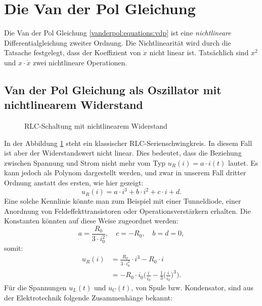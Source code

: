%
%
\section{Die Van der Pol Gleichung
\label{vanderpol:section:vdp_gleichung}}
Die Van der Pol Gleichung \eqref{vanderpol:equations:vdp} ist eine {\em nichtlineare} Differentialgleichung zweiter Ordnung. 
%
Die Nichtlinearität wird durch die Tatsache festgelegt, dass der Koeffizient von $\dot{x}$ nicht linear ist. Tatsächlich sind $x^{2}$ und $x \cdot \dot{x}$ zwei nichtlineare Operationen.

\subsection{Van der Pol Gleichung als Oszillator mit nichtlinearem Widerstand
\label{vanderpol:subsection:RLC}}
\begin{figure}
\centering
{} 
\caption{RLC-Schaltung mit nichtlinearem Widerstand \label{vanderpol:figures:circuit}}
\end{figure}
In der Abbildung \ref{vanderpol:figures:circuit} steht ein klassischer RLC-Serienschwingkreis. In diesem Fall ist aber der Widerstandswert nicht linear. Dies bedeutet, dass die Beziehung zwischen Spannung und Strom nicht mehr vom Typ $u_R(i) = a \cdot i(t)$ lautet. Es kann jedoch als Polynom dargestellt werden, und zwar in unserem Fall dritter Ordnung anstatt des ersten, wie hier gezeigt: 
%
%
%
%
%
%
\begin{equation}
u_R(i) = a \cdot i^3 + b \cdot i^2 + c \cdot i + d.
\end{equation}
Eine solche Kennlinie könnte man zum Beispiel mit einer Tunneldiode, einer Anordnung von Feldeffekttransistoren oder Operationsverstärkern erhalten. Die Konstanten könnten auf diese Weise zugeordnet werden:
%
%
%
%
\begin{equation*}
a = \frac{R_0}{3 \cdot i_0^2}, \quad c = -R_0, \quad b = d = 0,
\end{equation*}
somit:
\begin{align*}
u_R(i) &= \frac{R_0}{3 \cdot i_0^2} \cdot i^3 - R_0 \cdot i \\ 
&= -R_0 \cdot i_0 \biggl(\frac{i}{i_0} - \frac{1}{3} \biggl(\frac{i}{i_0} \biggr)^3 \biggr).  
\end{align*}
Für die Spannungen $u_{L}(t)$ und $u_{C}(t)$, von Spule bzw. Kondensator, sind aus der Elektrotechnik folgende Zusammenhänge bekannt:
%

